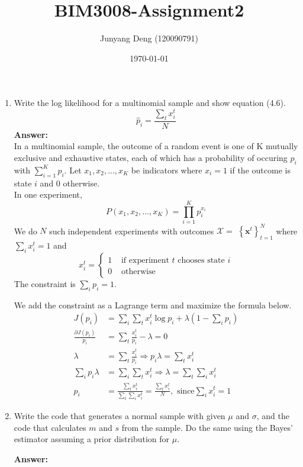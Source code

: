 \documentclass{article}
\title{BIM3008-Assignment2}
\author{Junyang Deng (120090791)}
\date{\today}
\begin{document}
 
\maketitle

\begin{enumerate}
    \item Write the log likelihood for a multinomial sample and show equation (4.6). %
    $$
    \hat{p}_i=\frac{\sum_t x_i^t}{N}
    $$
    \textbf{Answer:} \\
    In a multinomial sample, the outcome of a random event is one of K mutually exclusive and exhaustive states, each of which has a probability of occuring $p_i$ with $\sum^K_{i=1}p_i$. Let $x_1, x_2,...,x_K$ be indicators where $x_i=1$ if the outcome is state $i$ and 0 otherwise.\\
    In one experiment, 
    $$
    P\left(x_1, x_2, \ldots, x_K\right)=\prod_{i=1}^K p_i^{x_i}
    $$
    We do $N$ such independent experiments with outcomes $\mathcal{X}=$ $\left\{\boldsymbol{x}^t\right\}_{t=1}^N$ where $\sum_i x_i^t=1$ and
    $$
    x_i^t= \begin{cases}1 & \text { if experiment } t \text { chooses state } i \\ 0 & \text { otherwise }\end{cases}$$
    The constraint is $\sum_i p_i=1$.

    We add the constraint as a Lagrange term and maximize the formula below.
    $$
    \begin{aligned}
    J\left(p_i\right) &=\sum_i \sum_t x_i^t \log p_i+\lambda\left(1-\sum_i p_i\right) \\
    \frac{\partial J(p_i)}{p_i} &=\sum_t\frac{x_i^t}{p_i}-\lambda=0 \\
    \lambda &=\sum_t\frac{x_i^t}{p_i} \Rightarrow p_i \lambda=\sum_t x_i^t \\
    \sum_i p_i \lambda &=\sum_i \sum_t x_i^t \Rightarrow \lambda=\sum_t \sum_i x_i^t \\
    p_i &=\frac{\sum_t x_i^t}{\sum_t \sum_i x_i^t}=\frac{\sum_t x_i^t}{N}, \text{ since} \sum_i x_i^t=1
    \end{aligned}
    $$


    \item Write the code that generates a normal sample with given $\mu$ and $\sigma$, and the code that calculates $m$ and $s$ from the sample. Do the same using the Bayes’ estimator assuming a prior distribution for $\mu$. %
    
    \textbf{Answer:} \\
        


\end{enumerate}
\end{document}
